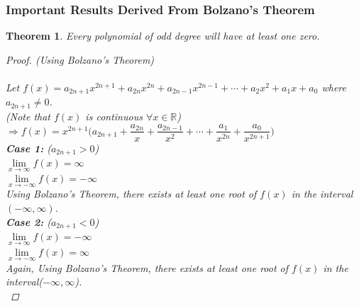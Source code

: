 \documentclass[14]{article}
\newtheorem{theorem}{Theorem}
\theoremstyle{definition}
\begin{document}
\subsubsection{Important Results Derived From Bolzano's Theorem}
\begin{theorem}
Every polynomial of odd degree will have at least one zero.
\begin{proof} (Using Bolzano's Theorem)\\\\
Let $f(x) = a_{2n+1}x^{2n+1} + a_{2n} x^{2n} + a_{2n-1} x^{2n-1} + \cdots + a_2 x^2 + a_1 x + a_0 $ where $a_{2n+1} \neq 0$.\\
(Note that $f(x)$ is continuous $\forall x \in \mathbb{R}$)\\
$\Rightarrow f(x) = x^{2n+1}\Big(a_{2n+1} + \dfrac{a_{2n}}{x} + \dfrac{a_{2n-1}}{x^2} + \cdots + \dfrac{a_1}{x^{2n}} + \dfrac{a_0}{x^{2n+1}} \Big)$\\
\textbf{Case 1:} ($a_{2n+1} > 0$)\\
$\lim\limits_{x \to \infty} f(x) = \infty$\\
$\lim\limits_{x \to -\infty} f(x) = -\infty$\\
Using Bolzano's Theorem, there exists at least one root of $f(x)$ in the interval $(-\infty, \infty)$.\\
\textbf{Case 2:} ($a_{2n + 1} < 0$)\\
$\lim\limits_{x \to \infty} f(x) = -\infty$\\
$\lim\limits_{x \to -\infty} f(x) = \infty$\\
Again, Using Bolzano's Theorem, there exists at least one root of $f(x)$ in the interval($-\infty, \infty$).\\
\end{proof}
\end{theorem}
\end{document}
